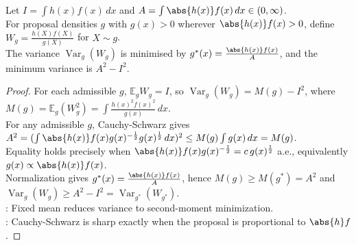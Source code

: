 \begin{theorem} \label{thm:optimal-importance-density} \\
Let $I=\int h(x)f(x)\,dx$ and $A=\int \abs{h(x)}f(x)\,dx\in(0,\infty)$.\\
For proposal densities $g$ with $g(x)>0$ wherever $\abs{h(x)}f(x)>0$, define $W_g=\frac{h(X)f(X)}{g(X)}$ for $X\sim g$.\\
The variance $\operatorname{Var}_g(W_g)$ is minimised by $g^*(x)=\frac{\abs{h(x)}f(x)}{A}$, and the minimum variance is $A^2-I^2$.
\begin{proof} For each admissible $g$, $\mathbb{E}_g W_g=I$, so $\operatorname{Var}_g(W_g)=M(g)-I^2$, where $M(g)=\mathbb{E}_g(W_g^2)=\int \frac{h(x)^2f(x)^2}{g(x)}\,dx$.\\
For any admissible $g$, Cauchy-Schwarz gives $A^2=(\int \abs{h(x)}f(x)g(x)^{-\frac{1}{2}}g(x)^{\frac{1}{2}}\,dx)^2\leq M(g)\int g(x)\,dx=M(g)$.\\
Equality holds precisely when $\abs{h(x)}f(x)g(x)^{-\frac{1}{2}}=c\,g(x)^{\frac{1}{2}}$ a.e., equivalently $g(x)\propto \abs{h(x)}f(x)$.\\
Normalization gives $g^*(x)=\frac{\abs{h(x)}f(x)}{A}$, hence $M(g)\geq M(g^*)=A^2$ and $\operatorname{Var}_g(W_g)\geq A^2-I^2=\operatorname{Var}_{g^*}(W_{g^*})$.\\
: Fixed mean reduces variance to second-moment minimization.\\
: Cauchy-Schwarz is sharp exactly when the proposal is proportional to $\abs{h}f$.
\end{proof}
\end{theorem}
